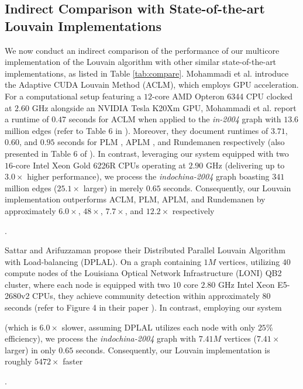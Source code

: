 \subsection{Indirect Comparison with State-of-the-art Louvain Implementations}
\label{sec:comparison-indirect}

We now conduct an indirect comparison of the performance of our multicore implementation of the Louvain algorithm with other similar state-of-the-art implementations, as listed in Table \ref{tab:compare}. Mohammadi et al. \cite{com-mohammadi20} introduce the Adaptive CUDA Louvain Method (ACLM), which employs GPU acceleration. For a computational setup featuring a $12$-core AMD Opteron 6344 CPU clocked at $2.60$ GHz alongside an NVIDIA Tesla K20Xm GPU, Mohammadi et al. report a runtime of $0.47$ seconds for ACLM when applied to the \textit{in-2004} graph with $13.6$ million edges (refer to Table 6 in \cite{com-mohammadi20}). Moreover, they document runtimes of $3.71$, $0.60$, and $0.95$ seconds for PLM \cite{staudt2015engineering}, APLM \cite{com-fazlali17}, and Rundemanen \cite{com-naim17} respectively (also presented in Table 6 of \cite{com-mohammadi20}). In contrast, leveraging our system equipped with two $16$-core Intel Xeon Gold 6226R CPUs operating at $2.90$ GHz (delivering up to $3.0\times$ higher performance), we process the \textit{indochina-2004} graph boasting $341$ million edges ($25.1\times$ larger) in merely $0.65$ seconds. Consequently, our Louvain implementation outperforms ACLM, PLM, APLM, and Rundemanen by approximately $6.0\times$, $48\times$, $7.7\times$, and $12.2\times$ respectively.

Sattar and Arifuzzaman \cite{sattar2022scalable} propose their Distributed Parallel Louvain Algorithm with Load-balancing (DPLAL). On a graph containing $1M$ vertices, utilizing $40$ compute nodes of the Louisiana Optical Network Infrastructure (LONI) QB2 cluster, where each node is equipped with two $10$ core $2.80$ GHz Intel Xeon E5-2680v2 CPUs, they achieve community detection within approximately $80$ seconds (refer to Figure 4 in their paper \cite{sattar2022scalable}). In contrast, employing our system (which is $6.0\times$ slower, assuming DPLAL utilizes each node with only $25\%$ efficiency), we process the \textit{indochina-2004} graph with $7.41M$ vertices ($7.41\times$ larger) in only $0.65$ seconds. Consequently, our Louvain implementation is roughly $5472\times$ faster.

